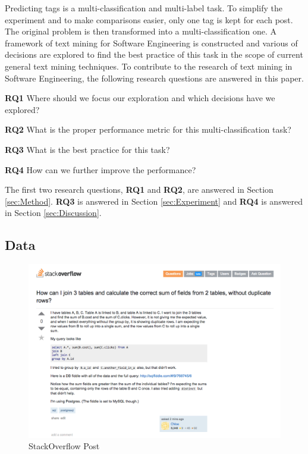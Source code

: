 \documentclass{sig-alternate-05-2015}
\begin{document}
Predicting tags is a multi-classification and multi-label task. To simplify the experiment and to make comparisons easier, only one tag is kept for each post. The original problem is then transformed into a multi-classification one. A framework of text mining for Software Engineering is constructed and various of decisions are explored to find the best practice of this task in the scope of current general text mining techniques. To contribute to the research of text mining in Software Engineering, the following research questions are answered in this paper.

\textbf{RQ1} Where should we focus our exploration and which decisions have we explored?

\textbf{RQ2} What is the proper performance metric for this multi-classification task?

\textbf{RQ3} What is the best practice for this task?

\textbf{RQ4} How can we further improve the performance?

The first two research questions, \textbf{RQ1} and \textbf{RQ2}, are answered in Section \ref{sec:Method}. \textbf{RQ3} is answered in Section \ref{sec:Experiment} and \textbf{RQ4} is answered in Section \ref{sec:Discussion}.

\subsection{Data}

\begin{figure}[ht]
  \includegraphics[width=\linewidth]{./fig/example.png}
  \caption{StackOverflow Post}
  \label{fig:example}
\end{figure}
\end{document}
